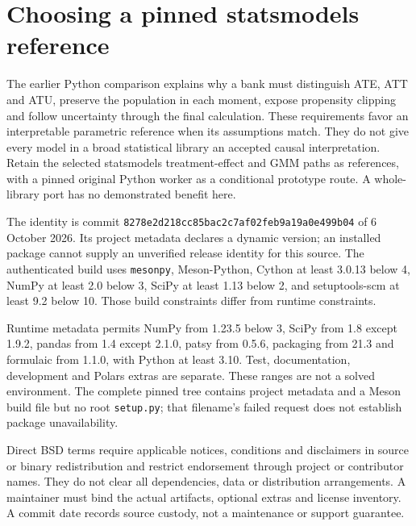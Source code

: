 \section{Choosing a pinned statsmodels reference}
\label{sec:exec24-statsmodels-reuse}
The earlier Python comparison explains why a bank must distinguish ATE, ATT and ATU, preserve the population in each moment, expose propensity clipping and follow uncertainty through the final calculation. These requirements favor an interpretable parametric reference when its assumptions match. They do not give every model in a broad statistical library an accepted causal interpretation. Retain the selected statsmodels treatment-effect and GMM paths as references, with a pinned original Python worker as a conditional prototype route. A whole-library port has no demonstrated benefit here.~\citep{exec20_python_effect_source,exec20_python_effect_reference}

The identity is commit \texttt{8278e2d218cc85bac2c7af02feb9a19a0e499b04} of 6 October 2026. Its project metadata declares a dynamic version; an installed package cannot supply an unverified release identity for this source. The authenticated build uses \texttt{mesonpy}, Meson-Python, Cython at least 3.0.13 below 4, NumPy at least 2.0 below 3, SciPy at least 1.13 below 2, and setuptools-scm at least 9.2 below 10. Those build constraints differ from runtime constraints.~\citep{exec24_statsmodels_distribution}

Runtime metadata permits NumPy from 1.23.5 below 3, SciPy from 1.8 except 1.9.2, pandas from 1.4 except 2.1.0, patsy from 0.5.6, packaging from 21.3 and formulaic from 1.1.0, with Python at least 3.10. Test, documentation, development and Polars extras are separate. These ranges are not a solved environment. The complete pinned tree contains project metadata and a Meson build file but no root \texttt{setup.py}; that filename's failed request does not establish package unavailability.~\citep{exec24_statsmodels_distribution}

Direct BSD terms require applicable notices, conditions and disclaimers in source or binary redistribution and restrict endorsement through project or contributor names. They do not clear all dependencies, data or distribution arrangements. A maintainer must bind the actual artifacts, optional extras and license inventory. A commit date records source custody, not a maintenance or support guarantee.~\citep{exec20_python_effect_source,exec24_statsmodels_distribution}

